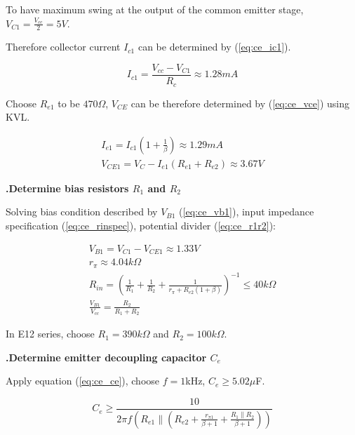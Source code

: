 \documentclass[a4paper,notitlepage,10pt]{report}
\newcommand{\tab}{\hspace{0.75cm}}
\newcommand{\fontSubHeading}{\fontsize{10pt}{11pt}\selectfont}
\newcounter{sections}
\newcounter{subsections}[sections]
\begin{document}
\begin{multicols}{2}
To have maximum swing at the output of the common emitter stage, $V_{C1} = \frac{V_{cc}}{2} = 5V$.

Therefore collector current $I_{c1}$ can be determined by (\ref{eq:ce_ic1}).
\parskip=0pt

\begin{equation}
	\label{eq:ce_ic1}
	I_{c1} = \frac{V_{cc} - V_{C1}}{R_c} \approx 1.28mA
\end{equation}
\parskip=6pt

Choose $R_{e1}$ to be $470\Omega$, $V_{CE}$ can be therefore determined by (\ref{eq:ce_vce}) using KVL.
\parskip=0pt

\begin{gather}
	I_{e1} = I_{c1} \left( 1 + \frac{1}{\beta} \right) \approx 1.29mA \nonumber \\
	\label{eq:ce_vce}
	V_{CE1} = V_{C} - I_{e1} \left( R_{e1} + R_{e2} \right) \approx 3.67V
\end{gather}
\parskip=6pt

\fontSubHeading
{}
\textbf{.\tab Determine bias resistors $R_1$ and $R_2$}

Solving bias condition described by $V_{B1}$ (\ref{eq:ce_vb1}), input impedance specification (\ref{eq:ce_rinspec}), potential divider (\ref{eq:ce_r1r2}):
\parskip=0pt

\begin{gather}
	\label{eq:ce_vb1}
	V_{B1} = V_{C1} - V_{CE1} \approx 1.33V \\
	r_\pi \approx 4.04k\Omega \nonumber \\
	\label{eq:ce_rinspec}
	R_{in} = \left(\frac{1}{R_1} + \frac{1}{R_2} + \frac{1}{r_\pi + R_{e2}\left( 1 + \beta \right)}\right)^{-1} \leq 40k\Omega\\
	\label{eq:ce_r1r2}
	\frac{V_{B1}}{V_{cc}} = \frac{R_2}{R_1 + R_2}
\end{gather}
\parskip=6pt

In E12 series, choose $R_1 = 390k\Omega$ and $R_2 = 100k\Omega$.

\fontSubHeading
{}
\textbf{.\tab Determine emitter decoupling capacitor $C_e$}

Apply equation (\ref{eq:ce_ce}), choose $f = 1$kHz, $C_e \geq 5.02\mu$F.
\parskip=0pt

\begin{equation}
	\label{eq:ce_ce}
	C_e \geq \frac{10}{2\pi f\left(R_{e1} \| \left(R_{e2} + \frac{r_{\pi 1}}{\beta + 1} + \frac{R_1 \| R_2}{\beta + 1}\right)\right)}
\end{equation}
\parskip=6pt


\end{multicols}
\end{document}
